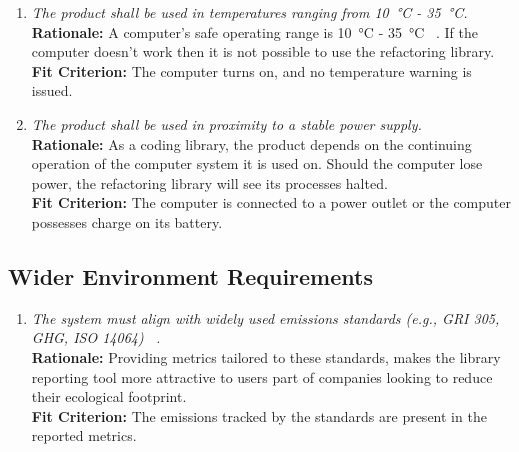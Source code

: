 \documentclass[12pt]{article}
\begin{document}
\begin{enumerate}[label=OER-EP \arabic*., wide=0pt, leftmargin=*]
	\item \emph{The product shall be used in temperatures ranging from \SI{10}{\celsius} - \SI{35}{\celsius}.}\\[2mm]
    {\bf Rationale:} A computer's safe operating range is \SI{10}{\celsius} - \SI{35}{\celsius} ~\citep{PCTemp}. If the computer doesn't work then it is not possible to use the refactoring library. \\
    {\bf Fit Criterion:} The computer turns on, and no temperature warning is issued.
  \item \emph{The product shall be used in proximity to a stable power supply.}\\
  {\bf Rationale:} As a coding library, the product depends on the continuing operation of the computer system it is used on. Should the computer lose power, the refactoring library will see its processes halted. \\
  {\bf Fit Criterion:} The computer is connected to a power outlet or the computer possesses charge on its battery. 
\end{enumerate}

\subsection{Wider Environment Requirements}
\begin{enumerate}[label=OER-WE \arabic*., wide=0pt, leftmargin=*]
	\item \emph{The system must align with widely used emissions standards (e.g., GRI 305, GHG, ISO 14064) ~\citep{GHG,ISO14064,GRI305}.}\\[2mm]
    {\bf Rationale:} Providing metrics tailored to these standards, makes the library reporting tool more attractive to users part of companies looking to reduce their ecological footprint. \\
    {\bf Fit Criterion:} The emissions tracked by the standards are present in the reported metrics.  
\end{enumerate}
\end{document}

